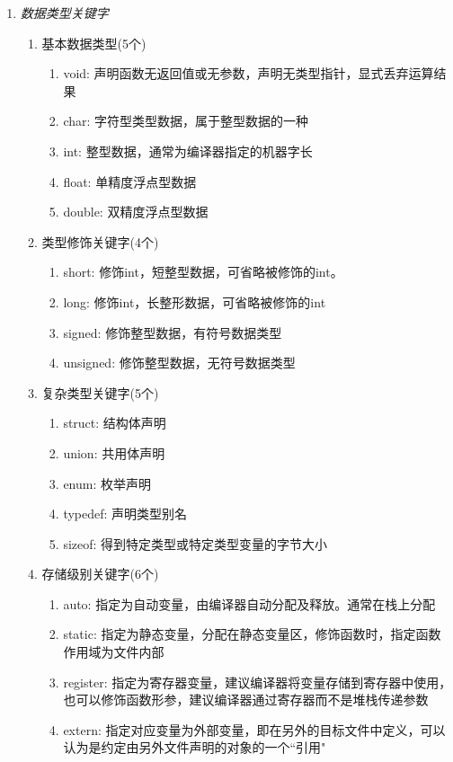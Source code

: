 \begin{enumerate}[label=\arabic*)]
	\item \textit{数据类型关键字}
	\begin{enumerate}
		\item 基本数据类型(5个)
		\begin{enumerate}
			\item void: 声明函数无返回值或无参数，声明无类型指针，显式丢弃运算结果
			\item char: 字符型类型数据，属于整型数据的一种
			\item int: 整型数据，通常为编译器指定的机器字长
			\item float: 单精度浮点型数据
			\item double: 双精度浮点型数据
		\end{enumerate}
		\item 类型修饰关键字(4个)
		\begin{enumerate}
			\item short: 修饰int，短整型数据，可省略被修饰的int。
			\item long: 修饰int，长整形数据，可省略被修饰的int
			\item signed: 修饰整型数据，有符号数据类型
			\item unsigned: 修饰整型数据，无符号数据类型
		\end{enumerate}
		\item 复杂类型关键字(5个)
		\begin{enumerate}
			\item struct: 结构体声明
			\item union: 共用体声明
			\item enum: 枚举声明
			\item typedef: 声明类型别名
			\item sizeof: 得到特定类型或特定类型变量的字节大小
		\end{enumerate}
		\item 存储级别关键字(6个)
		\begin{enumerate}
			\item auto: 指定为自动变量，由编译器自动分配及释放。通常在栈上分配
			\item static: 指定为静态变量，分配在静态变量区，修饰函数时，指定函数作用域为文件内部
			\item register: 指定为寄存器变量，建议编译器将变量存储到寄存器中使用，也可以修饰函数形参，建议编译器通过寄存器而不是堆栈传递参数
			\item extern: 指定对应变量为外部变量，即在另外的目标文件中定义，可以认为是约定由另外文件声明的对象的一个``引用"

\end{enumerate}
\end{enumerate}
\end{enumerate}
